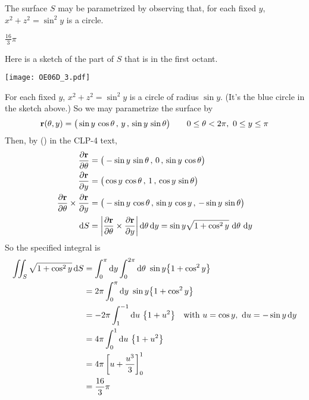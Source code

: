\begin{hint} 
The surface $S$ may be parametrized by observing that, for each fixed 
$y$, $x^2 + z^2 = \sin^2y$ is a circle.
\end{hint}

\begin{answer} 
$\frac{16}{3}\pi$
\end{answer}

\begin{solution}
Here is a sketch of the part of $S$ that is in the first octant.

\begin{center}
       \texttt{[image: OE06D\_3.pdf]}
\end{center}

For each fixed $y$, $x^2+z^2=\sin^2y$ is a circle of
radius $\sin y$. (It's the blue circle in the sketch above.)
So we may parametrize the surface by
\begin{align*}
\mathbf{r}(\theta,y)
=\big(\sin y\,\cos\theta\,,\, y \,,\, \sin y\,\sin\theta\big)\qquad
0\le\theta<2\pi,\ 0\le y\le \pi
\end{align*}
Then, by () in the CLP-4 text,
\begin{align*}
\frac{\partial \mathbf{r}}{\partial\theta}
 &= \big(-\sin y\,\sin\theta\,,\, 0 \,,\, \sin y\,\cos\theta\big) \\
\frac{\partial \mathbf{r}}{\partial y}
 &= \big(\cos y\,\cos\theta\,,\, 1 \,,\, \cos y\,\sin\theta\big) \\
\frac{\partial \mathbf{r}}{\partial\theta} \times
     \frac{\partial \mathbf{r}}{\partial y}
&=\big(-\sin y\,\cos\theta\,,\, \sin y\,\cos y\,,\,-\sin y\,\sin\theta \big) \\
\mathrm{d}S
&= \left|\frac{\partial \mathbf{r}}{\partial\theta} \times
     \frac{\partial \mathbf{r}}{\partial y}\right|\mathrm{d}\theta\,\mathrm{d}y
=\sin y\sqrt{1+\cos^2 y}\ \mathrm{d}\theta\ \mathrm{d}y
\end{align*}
So the specified integral is
\begin{align*}
\dblInt_S\sqrt{1 + \cos^2y}\, \dee{S}
&= \int_0^\pi\dee{y} \int_0^{2\pi}\dee{\theta}\ 
                \sin y\big\{1+\cos^2 y\big\} \\
&= 2\pi \int_0^\pi\dee{y}\ 
                \sin y\big\{1+\cos^2 y\big\} \\
&= - 2\pi \int_1^{-1} \dee{u}\ \big\{1+u^2\big\}
           \quad\text{with }u=\cos y,\ \dee{u}=-\sin y\,\dee{y} \\
&= 4\pi \int_0^1 \dee{u}\ \big\{1+u^2\big\} \\
&=4\pi\left[u+\frac{u^3}{3}\right]_0^1 \\
&= \frac{16}{3}\pi
\end{align*}


\end{solution}

